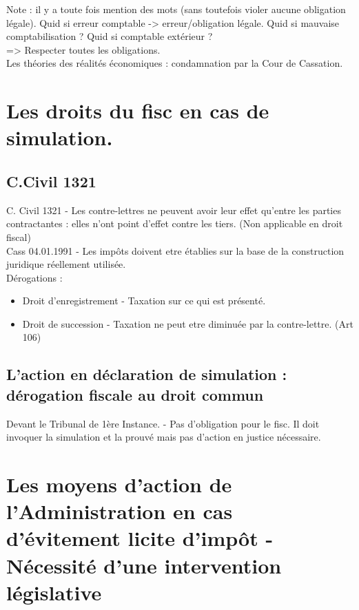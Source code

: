 \documentclass{book}
\begin{document}
Note : il y a toute fois mention des mots (sans toutefois violer aucune obligation légale). Quid si erreur comptable -> erreur/obligation légale. Quid si mauvaise comptabilisation ? Quid si comptable extérieur ?\\

=> Respecter toutes les obligations.\\


Les théories des réalités économiques : condamnation par la Cour de Cassation.


\section{Les droits du fisc en cas de simulation.}

\subsection{C.Civil 1321}
C. Civil 1321 - Les contre-lettres ne peuvent avoir leur effet qu'entre les parties contractantes : elles n'ont point d'effet contre les tiers. (Non applicable en droit fiscal)\\

Cass 04.01.1991 - Les impôts doivent etre établies sur la base de la construction juridique réellement utilisée.\\

Dérogations :\\

\begin{itemize}
\item Droit d'enregistrement - Taxation sur ce qui est présenté.
\item Droit de succession - Taxation ne peut etre diminuée par la contre-lettre. (Art 106)
\end{itemize} 

\subsection{L'action en déclaration de simulation : dérogation fiscale au droit commun}

Devant le Tribunal de 1ère Instance. - Pas d'obligation pour le fisc. Il doit invoquer la simulation et la prouvé mais pas d'action en justice nécessaire.

\section{Les moyens d'action de l'Administration en cas d'évitement licite d'impôt - Nécessité d'une intervention législative}
\end{document}
